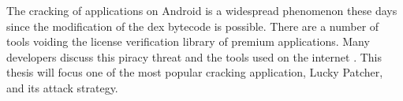 The cracking of applications on Android is a widespread phenomenon these days since the modification of the dex bytecode is possible.
There are a number of tools voiding the license verification library of premium applications.
Many developers discuss this piracy threat and the tools used on the internet .
\newline
This thesis will focus one of the most popular cracking application, Lucky Patcher, and its attack strategy.

